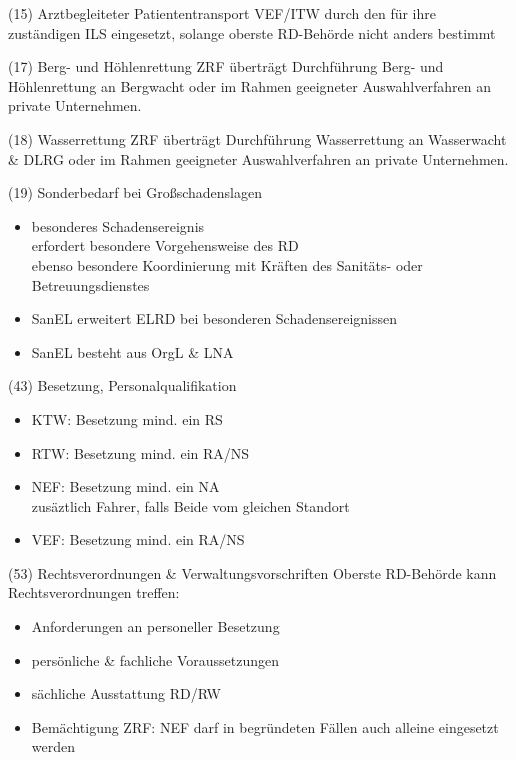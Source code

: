 \begin{sectionbox}{(15) Arztbegleiteter Patiententransport}
    VEF/ITW durch den für ihre zuständigen ILS eingesetzt, solange oberste RD-Behörde nicht anders bestimmt
\end{sectionbox}
\begin{sectionbox}{(17) Berg- und Höhlenrettung}
    ZRF überträgt Durchführung Berg- und Höhlenrettung an Bergwacht oder im Rahmen geeigneter Auswahlverfahren an private Unternehmen.
\end{sectionbox}
\begin{sectionbox}{(18) Wasserrettung}
    ZRF überträgt Durchführung Wasserrettung an Wasserwacht \& DLRG oder im Rahmen geeigneter Auswahlverfahren an private Unternehmen.
\end{sectionbox}
\begin{sectionbox}{(19) Sonderbedarf bei Großschadenslagen}
    \begin{itemize}
        \item besonderes Schadensereignis\\
        \ra erfordert besondere Vorgehensweise des RD\\
        \ra ebenso besondere Koordinierung mit Kräften des Sanitäts- oder Betreuungsdienstes
        \item SanEL erweitert ELRD bei besonderen Schadensereignissen
        \item SanEL besteht aus OrgL \& LNA
    \end{itemize}
\end{sectionbox}
\begin{sectionbox}{(43) Besetzung, Personalqualifikation}
    \begin{itemize}
        \item KTW: Besetzung mind. ein RS
        \item RTW: Besetzung mind. ein RA/NS
        \item NEF: Besetzung mind. ein NA\\
        \ra zusäztlich Fahrer, falls Beide vom gleichen Standort
        \item VEF: Besetzung mind. ein RA/NS
    \end{itemize}
\end{sectionbox}
\begin{sectionbox}{(53) Rechtsverordnungen \& Verwaltungsvorschriften}
    Oberste RD-Behörde kann Rechtsverordnungen treffen:
    \begin{itemize}
        \item Anforderungen an personeller Besetzung
        \item persönliche \& fachliche Voraussetzungen
        \item sächliche Ausstattung RD/RW
        \item Bemächtigung ZRF: NEF darf in begründeten Fällen auch alleine eingesetzt werden
    \end{itemize}
\end{sectionbox}
